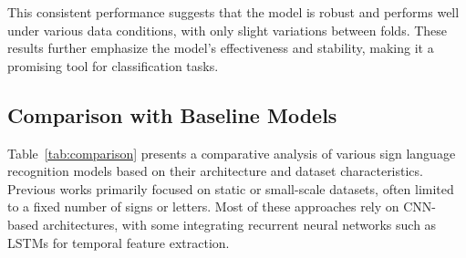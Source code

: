 \documentclass[preprint,12pt,authoryear]{elsarticle}
\begin{document}
This consistent performance suggests that the model is robust and performs well under various data conditions, with only slight variations between folds. These results further emphasize the model’s effectiveness and stability, making it a promising tool for classification tasks.
\begin{table}[h]
    \centering
    
    \caption{Performance metrics for each fold in cross-validation.}
    \label{tab:performance_metrics}
\end{table}







\subsection{Comparison with Baseline Models}

Table~\ref{tab:comparison} presents a comparative analysis of various sign language recognition models based on their architecture and dataset characteristics. Previous works primarily focused on static or small-scale datasets, often limited to a fixed number of signs or letters. Most of these approaches rely on CNN-based architectures, with some integrating recurrent neural networks such as LSTMs for temporal feature extraction.
\end{document}
